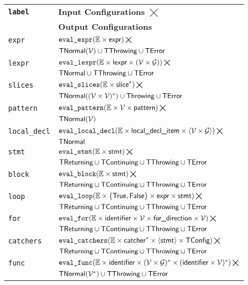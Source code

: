 \documentclass{book}
\newcommand\XGraphs[0]{\mathcal{G}}
\newcommand\vals[0]{\mathcal{V}}
\newcommand\evalexpr[1]{\texttt{eval\_expr}(#1)}
\newcommand\evallexpr[1]{\texttt{eval\_lexpr}(#1)}
\newcommand\evalpattern[1]{\texttt{eval\_pattern}(#1)}
\newcommand\evallocaldecl[1]{\texttt{eval\_local\_decl}(#1)}
\newcommand\evalslices[1]{\texttt{eval\_slices}(#1)}
\newcommand\evalstmt[1]{\texttt{eval\_stmt}(#1)}
\newcommand\evalblock[1]{\texttt{eval\_block}(#1)}
\newcommand\evalloop[1]{\texttt{eval\_loop}(#1)}
\newcommand\evalfor[1]{\texttt{eval\_for}(#1)}
\newcommand\evalcatchers[1]{\texttt{eval\_catchers}(#1)}
\newcommand\evalfunc[1]{\texttt{eval\_func}(#1)}
\newcommand\Throwing[0]{\textsf{Throwing}}
\begin{document}
\begin{tabular}{ll}
  \textbf{\texttt{label}} & \textbf{Input Configurations $\bigtimes$} \\
                          & \textbf{Output Configurations} \\
  \hline
  \hline
  \texttt{expr}         & $\evalexpr{\envs \times \expr} \bigtimes$\\
                        & $\TNormal(\vals) \cup \TThrowing \cup \TError$\\
  \hline
  \texttt{lexpr}        & $\evallexpr{\envs \times \lexpr \times (\vals \times \XGraphs)} \bigtimes$\\
                        & $\textsf{TNormal} \cup \textsf{TThrowing} \cup \textsf{TError}$\\
  \hline
  \texttt{slices}       & $\evalslices{\envs \times \slice^*} \bigtimes$\\
                        & $\TNormal((\vals \times \vals)^*) \cup \Throwing \cup \TError$ \\
  \hline
  \texttt{pattern}      & $\evalpattern{\envs \times \vals \times \pattern} \bigtimes$\\
                        & $\TNormal(\vals)$ \\
  \hline
  \texttt{local\_decl}  & $\evallocaldecl{\envs \times \localdeclitem \times \langle\vals\times\XGraphs\rangle} \bigtimes$\\
  & $\textsf{TNormal}$ \\
  \hline
  \texttt{stmt}         & $\evalstmt{\envs \times \stmt} \bigtimes$\\
                        & $\textsf{TReturning} \cup \textsf{TContinuing} \cup \textsf{TThrowing} \cup \textsf{TError}$ \\
  \hline
  \texttt{block}        & $\evalblock{\envs \times \stmt} \bigtimes$\\
                        & $\textsf{TReturning} \cup \textsf{TContinuing} \cup \textsf{TThrowing} \cup \textsf{TError}$ \\
  \hline
  \texttt{loop}         & $\evalloop{\envs \times \{\True,\False\} \times \expr \times \stmt} \bigtimes$\\
                        & $\textsf{TReturning} \cup \textsf{TContinuing} \cup \textsf{TThrowing} \cup \textsf{TError}$ \\
  \hline
  \texttt{for}          & $\evalfor{\envs \times \identifier \times \vals \times \fordirection \times \vals} \bigtimes$\\
                        & $\textsf{TReturning} \cup \textsf{TContinuing} \cup \textsf{TThrowing} \cup \textsf{TError}$ \\
  \hline
  \texttt{catchers}     & $\evalcatchers{\envs \times \catcher^* \times \langle\stmt\rangle \times \TConfig} \bigtimes$\\
                        & $\textsf{TReturning} \cup \textsf{TContinuing} \cup \textsf{TThrowing} \cup \textsf{TError}$ \\
  \hline
  \texttt{func}         & $\evalfunc{\envs \times \identifier \times (\vals \times \XGraphs)^* \times (\identifier\times\vals)^*} \bigtimes$ \\
                        & $\TNormal(\vals^*) \cup \TThrowing \cup \TError$ \\
  \end{tabular}
\end{document}
